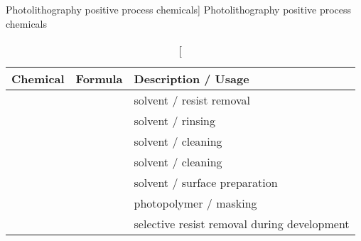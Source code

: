 \documentclass[../main.tex]{subfiles}%
\begin{document}
%
    \Xtable%
    \begin{table}%
        \caption%
            [Photolithography positive process chemicals]%
            {Photolithography positive process chemicals}%
        \label{tbl:pattern-process-pos-chemicals}%
        \begin{tabu}{ l c l }%
            \toprule%
            \centering\textbf{Chemical} &%
            \centering\textbf{Formula} &%
            \centering\textbf{Description / Usage}\\%
            \toprule%
             &%
             &%
            solvent / resist removal\\%
             &%
             &%
            solvent / rinsing\\%
             &%
             &%
            solvent / cleaning\\%
             &%
             &%
            solvent / cleaning\\%
             &%
             &%
            solvent / surface preparation\\%
             &%
             &%
            photopolymer / masking\\%
             &%
             &%
            selective resist removal during development\\%
            \bottomrule%
        \end{tabu}%
    \end{table}%
\end{document}
